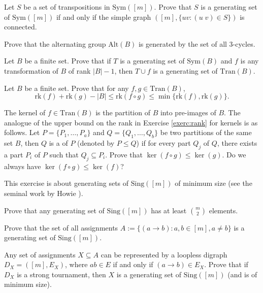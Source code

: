 \documentclass[a4paper, 11pt]{book}
\numberwithin{equation}{section}
\theoremstyle{plain}
\newcommand{\rank}{\mathrm{rk}}
\newcommand{\Tran}{\mathrm{Tran}}
\newcommand{\Sing}{\mathrm{Sing}}
\newcommand{\Sym}{\mathrm{Sym}}
\newcommand{\Alt}{\mathrm{Alt}}
\newcommand{\espace}{\;}
\renewcommand{\(}{\ldbrack}
\renewcommand{\)}{\rdbrack}
\newcommand{\BF}[1]{{\bf\boldmath{#1}\unboldmath}}
\begin{document}
\begin{exercises}
\item Let $S$ be a set of transpositions in $\Sym([m])$. Prove that $S$ is a generating set of $\Sym([m])$ if and only if the simple graph $([m], \{ uv : (u \espace v) \in S\} )$ is connected.

\item Prove that the alternating group $\Alt(B)$ is generated by the set of all 3-cycles.

\item \label{exerc:generating_sets_tran} Let $B$ be a finite set. Prove that if $T$ is a generating set of $\Sym(B)$ and $f$ is any transformation of $B$ of rank $|B|-1$, then $T \cup f$ is a generating set of $\Tran(B)$.


\item \label{exerc:rank} Let $B$ be a finite set. Prove that for any $f, g \in \Tran(B)$, 
\[
	\rank(f) + \rank(g) - |B| \le \rank(f \circ g) \le \min\{\rank(f), \rank(g)\}.
\]

\item The kernel of $f \in \Tran(B)$ is the partition of $B$ into pre-images of $B$. The analogue of the upper bound on the rank in Exercise \ref{exerc:rank} for kernels is as follows. Let $P = \{P_1, \dots, P_a\}$ and $Q = \{Q_1, \dots, Q_b\}$  be two partitions of the same set $B$, then $Q$ is a \BF{refinement} of $P$ (denoted by $P \le Q$) if for every part $Q_j$ of $Q$, there exists a part $P_i$ of $P$ such that $Q_j \subseteq P_i$. Prove that $\ker(f \circ g) \le \ker(g)$. Do we always have $\ker(f \circ g) \le \ker(f)$?


\item This exercise is about generating sets of $\Sing([m])$ of minimum size (see the seminal work by Howie \cite{How66, How78}).
\begin{exercises}
	\item Prove that any generating set of $\Sing([m])$ has at least $\binom{m}{2}$ elements.
	
	\item Prove that the set of all assignments $A := \{ (a \to b) : a,b \in [m], a \ne b \}$ is a generating set of $\Sing([m])$.
	
	\item Any set of assignments $X \subseteq A$ can be represented by a loopless digraph $D_X = ([m], E_X)$, where $ab \in E$ if and only if  $(a \to b) \in E_X$. Prove that if $D_X$ is a strong tournament, then $X$ is a generating set of $\Sing([m])$ (and is of minimum size).
	

\end{exercises}
\end{exercises}
\end{document}
